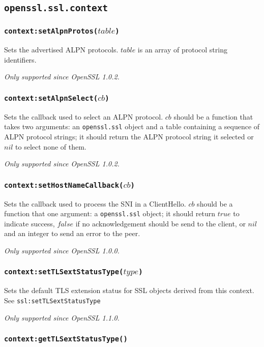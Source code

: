 \documentclass[11pt, oneside]{memoir}
\newcommand*{\fn}[1]{\texttt{#1}\xspace}
\newcommand*{\module}[1]{\texttt{#1}\xspace}
\newcounter{toccols}
\newenvironment{Module}[1]{
	\subsection{\texttt{#1}}
	\addtocontents{toc}{
		\protect\begin{multicols}{\value{toccols}}
	}
}{
	\addtocontents{toc}{\protect\end{multicols}}
}
\begin{document}
\begin{Module}{openssl.ssl.context}
\subsubsection[\fn{context:setAlpnProtos}]{\fn{context:setAlpnProtos($table$)}}

Sets the advertised ALPN protocols. $table$ is an array of protocol string identifiers.

\emph{Only supported since OpenSSL 1.0.2.}

\subsubsection[\fn{context:setAlpnSelect}]{\fn{context:setAlpnSelect($cb$)}}

Sets the callback used to select an ALPN protocol. $cb$ should be a function that takes two arguments: an \module{openssl.ssl} object and a table containing a sequence of ALPN protocol strings; it should return the ALPN protocol string it selected or $nil$ to select none of them.

\emph{Only supported since OpenSSL 1.0.2.}

\subsubsection[\fn{context:setHostNameCallback}]{\fn{context:setHostNameCallback($cb$)}}

Sets the callback used to process the SNI in a ClientHello. $cb$ should be a function that one argument: a \module{openssl.ssl} object; it should return $true$ to indicate success, $false$ if no acknowledgement should be send to the client, or $nil$ and an integer to send an error to the peer.

\emph{Only supported since OpenSSL 1.0.0.}

\subsubsection[\fn{context:setTLSextStatusType}]{\fn{context:setTLSextStatusType($type$)}}

Sets the default TLS extension status for SSL objects derived from this context.
See \fn{ssl:setTLSextStatusType}

\emph{Only supported since OpenSSL 1.1.0.}

\subsubsection[\fn{context:getTLSextStatusType}]{\fn{context:getTLSextStatusType()}}


\end{Module}
\end{document}
